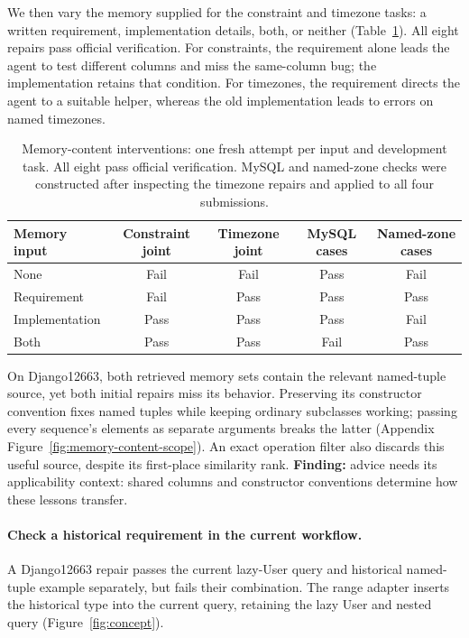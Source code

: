 We then vary the memory supplied for the constraint and timezone tasks:
a written requirement, implementation details, both, or neither
(Table~\ref{tab:memorycontent}). All eight repairs pass official verification.
For constraints, the requirement alone leads the agent to test different
columns and miss the same-column bug; the implementation retains that
condition. For timezones, the requirement directs the agent to a suitable
helper, whereas the old implementation leads to errors on named timezones.

\begin{table}[!htbp]
\centering
\caption{Memory-content interventions: one fresh attempt per input and development task.
All eight pass official verification. MySQL and named-zone checks were constructed
after inspecting the timezone repairs and applied to all four submissions.}
\label{tab:memorycontent}
\small
\begin{tabular}{lcccc}
\toprule
Memory input & Constraint joint & Timezone joint & MySQL cases & Named-zone cases \\
\midrule
None & Fail & Fail & Pass & Fail \\
Requirement & Fail & Pass & Pass & Pass \\
Implementation & Pass & Pass & Pass & Fail \\
Both & Pass & Pass & Fail & Pass \\
\bottomrule
\end{tabular}
\end{table}

On Django12663, both retrieved memory sets contain the relevant named-tuple
source, yet both initial repairs miss its behavior. Preserving its constructor
convention fixes named tuples while keeping ordinary subclasses working;
passing every sequence's elements as separate arguments breaks the latter
(Appendix Figure~\ref{fig:memory-content-scope}). An exact operation filter
also discards this useful source, despite its first-place similarity rank.
\textbf{Finding:} advice needs its applicability context: shared columns
and constructor conventions determine how these lessons transfer.

\paragraph{Check a historical requirement in the current workflow.}
\label{sec:composition-results}
A Django12663 repair passes the current lazy-User query and historical
named-tuple example separately, but fails their combination. The range
adapter inserts the historical type into the current query, retaining the
lazy User and nested query (Figure~\ref{fig:concept}).


